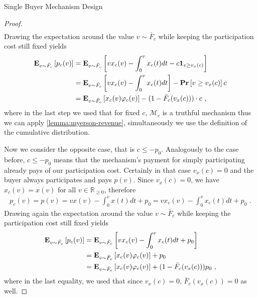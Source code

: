 \documentclass[11pt,a4paper]{article}
\newcommand{\RR}{\ensuremath{\mathbb{R}}}
\renewcommand{\Pr}[1]{\mbox{\rm\bf Pr}\left[#1\right]}
\newcommand{\Ex}[2][]{\mbox{\rm\bf E}_{#1}\left[#2\right]}
\newcommand{\1}[1]{\mbox{\rm\bf 1}_{#1}}
\newcommand{\eqdot}{\text{ .}}
\newcommand{\eqcomma}{\text{ ,}}
\begin{document}
\begin{section}{Single Buyer Mechanism Design}
\begin{proof}
\begin{align*}
     \end{align*}
     Drawing the expectation around the value $v \sim \bar{F}_c$ while keeping the participation cost still fixed yields
     \begin{equation}
         \label{eq:expected-revenue-first-case}
         \begin{aligned}
             \Ex[v \sim \bar{F}_c]{p_c(v)} & = \Ex[v \sim \bar{F}_c]{v x_c(v) - \int_0^v x_c(t) dt - c \1{v \geq v_x(c)}}   \\
                                           & = \Ex[v \sim \bar{F}_c]{v x_c(v) - \int_0^v x_c(t) dt} - \Pr{v \geq v_x(c)}c   \\
                                           & = \Ex[v \sim \bar{F}_c]{x_c(v) \varphi_c(v)} - (1 - \bar{F}_c(v_x(c))) \cdot c \eqcomma
         \end{aligned}
     \end{equation}
     where in the last step we used that for fixed $c$, $\mathcal{M}_c$ is a truthful mechanism thus we can apply \cref{lemma:myerson-revenue}, simultaneously we use the definition of the cumulative distribution.

     Now we consider the opposite case, that is $c \leq -p_0$.
     Analogously to the case before, $c \leq -p_0$ means that the mechanism's payment for simply participating already pays of our participation cost.
     Certainly in that case $v_x(c) = 0$ and the buyer always participates and pays $p(v)$.
     Since $v_x(c) = 0$, we have $x_c(v) = x(v)$ for all $v \in \RR_{\geq 0}$, therefore
     \begin{align*}
         p_c(v) = p(v) = v x(v) - \int_0^v x(t)dt + p_0 = v x_c(v) - \int_0^v x_c(t)dt + p_0 \eqdot
     \end{align*}
     Drawing again the expectation around the value $v \sim \bar{F}_c$ while keeping the participation cost still fixed yields
     \begin{equation}
         \label{eq:expected-revenue-second-case}
         \begin{aligned}
             \Ex[v \sim \bar{F}_c]{p_c(v)} & = \Ex[v \sim \bar{F}_c]{v x_c(v) - \int_0^v x_c(t)dt + p_0}                  \\
                                           & = \Ex[v \sim \bar{F}_c]{x_c(v) \varphi_c(v)} + p_0                           \\
                                           & = \Ex[v \sim \bar{F}_c]{x_c(v) \varphi_c(v)} + (1 - \bar{F}_{c}(v_x(c))) p_0 \eqcomma
         \end{aligned}
     \end{equation}
     where in the last equality, we used that since $v_x(c) = 0$, $\bar{F}_{c}(v_x(c)) = 0$ as well.


\end{proof}
\end{section}
\end{document}
